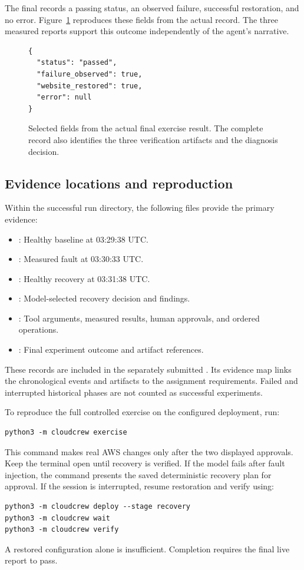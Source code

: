 \documentclass[11pt]{article}
\begin{document}
The final  records a passing status, an observed failure, successful restoration, and no error. Figure~\ref{fig:outcome} reproduces these fields from the actual record. The three measured reports support this outcome independently of the agent's narrative.

\begin{figure}[htbp]
\begin{lstlisting}
{
  "status": "passed",
  "failure_observed": true,
  "website_restored": true,
  "error": null
}
\end{lstlisting}
\caption{Selected fields from the actual final exercise result. The complete record also identifies the three verification artifacts and the diagnosis decision.}
\label{fig:outcome}
\end{figure}

\subsection{Evidence locations and reproduction}
Within the successful run directory, the following files provide the primary evidence:
\begin{itemize}
  \item {}: Healthy baseline at 03:29:38 UTC.
  \item {}: Measured fault at 03:30:33 UTC.
  \item {}: Healthy recovery at 03:31:38 UTC.
  \item {}: Model-selected recovery decision and findings.
  \item {}: Tool arguments, measured results, human approvals, and ordered operations.
  \item {}: Final experiment outcome and artifact references.
\end{itemize}
These records are included in the separately submitted . Its evidence map links the chronological events and artifacts to the assignment requirements. Failed and interrupted historical phases are not counted as successful experiments.

To reproduce the full controlled exercise on the configured deployment, run:
\begin{lstlisting}
python3 -m cloudcrew exercise
\end{lstlisting}
This command makes real AWS changes only after the two displayed approvals. Keep the terminal open until recovery is verified. If the model fails after fault injection, the command presents the saved deterministic recovery plan for approval. If the session is interrupted, resume restoration and verify using:
\begin{lstlisting}
python3 -m cloudcrew deploy --stage recovery
python3 -m cloudcrew wait
python3 -m cloudcrew verify
\end{lstlisting}
A restored configuration alone is insufficient. Completion requires the final live report to pass.
\end{document}
